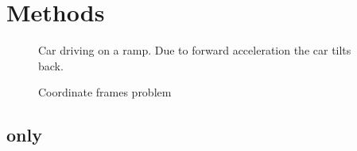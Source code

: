 \chapter{Methods}
\label{ch:Methods}

\begin{figure}[htpb]
    \centering
	
	\caption{Car driving on a ramp. Due to forward acceleration the car tilts back.}
	\label{fig:tikz_car_tilt}
\end{figure}
\begin{figure}[htpb]
    \centering
    
	\caption{Coordinate frames problem}
    \label{fig:tikz_car_frames}
\end{figure}



\section{ only}
